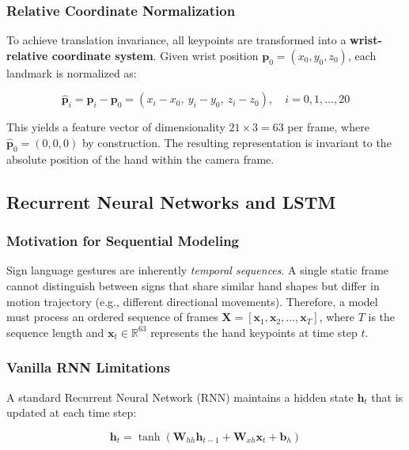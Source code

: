 \documentclass[12pt, a4paper]{article}
\begin{document}
\subsubsection{Relative Coordinate Normalization}

To achieve translation invariance, all keypoints are transformed into a \textbf{wrist-relative coordinate system}. Given wrist position $\mathbf{p}_0 = (x_0, y_0, z_0)$, each landmark is normalized as:

\begin{equation}
    \hat{\mathbf{p}}_i = \mathbf{p}_i - \mathbf{p}_0 = (x_i - x_0,\ y_i - y_0,\ z_i - z_0), \quad i = 0, 1, \ldots, 20
    \label{eq:relative_coords}
\end{equation}

This yields a feature vector of dimensionality $21 \times 3 = 63$ per frame, where $\hat{\mathbf{p}}_0 = (0, 0, 0)$ by construction. The resulting representation is invariant to the absolute position of the hand within the camera frame.

\subsection{Recurrent Neural Networks and LSTM}

\subsubsection{Motivation for Sequential Modeling}

Sign language gestures are inherently \textit{temporal sequences}. A single static frame cannot distinguish between signs that share similar hand shapes but differ in motion trajectory (e.g., different directional movements). Therefore, a model must process an ordered sequence of frames $\mathbf{X} = [\mathbf{x}_1, \mathbf{x}_2, \ldots, \mathbf{x}_T]$, where $T$ is the sequence length and $\mathbf{x}_t \in \mathbb{R}^{63}$ represents the hand keypoints at time step $t$.

\subsubsection{Vanilla RNN Limitations}

A standard Recurrent Neural Network (RNN) maintains a hidden state $\mathbf{h}_t$ that is updated at each time step:

\begin{equation}
    \mathbf{h}_t = \tanh(\mathbf{W}_{hh}\mathbf{h}_{t-1} + \mathbf{W}_{xh}\mathbf{x}_t + \mathbf{b}_h)
    \label{eq:rnn}
\end{equation}
\end{document}
